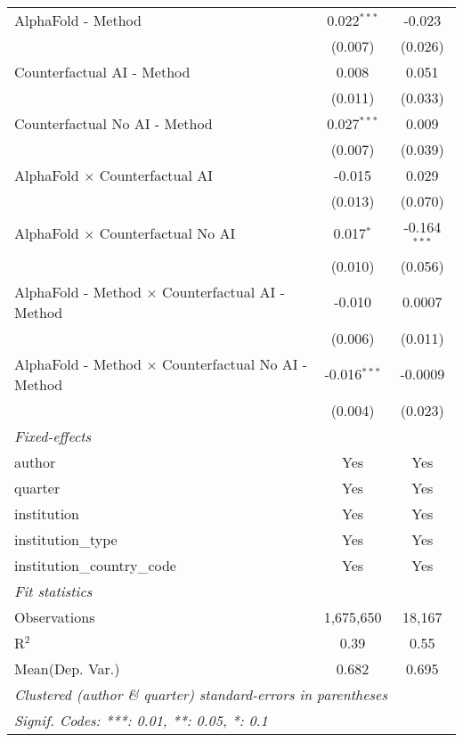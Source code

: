 \begin{tabular}{lcc}
   AlphaFold - Method                                         & 0.022$^{***}$  & -0.023\\   
                                                              & (0.007)        & (0.026)\\   
   Counterfactual AI - Method                                 & 0.008          & 0.051\\   
                                                              & (0.011)        & (0.033)\\   
   Counterfactual No AI - Method                              & 0.027$^{***}$  & 0.009\\   
                                                              & (0.007)        & (0.039)\\   
   AlphaFold $\times$ Counterfactual AI                       & -0.015         & 0.029\\   
                                                              & (0.013)        & (0.070)\\   
   AlphaFold $\times$ Counterfactual No AI                    & 0.017$^{*}$    & -0.164$^{***}$\\   
                                                              & (0.010)        & (0.056)\\   
   AlphaFold - Method $\times$ Counterfactual AI - Method     & -0.010         & 0.0007\\   
                                                              & (0.006)        & (0.011)\\   
   AlphaFold - Method $\times$ Counterfactual No AI - Method  & -0.016$^{***}$ & -0.0009\\   
                                                              & (0.004)        & (0.023)\\   
   \midrule
   \emph{Fixed-effects}\\
   author                                                     & Yes            & Yes\\  
   quarter                                                    & Yes            & Yes\\  
   institution                                                & Yes            & Yes\\  
   institution\_type                                          & Yes            & Yes\\  
   institution\_country\_code                                 & Yes            & Yes\\  
   \midrule
   \emph{Fit statistics}\\
   Observations                                               & 1,675,650      & 18,167\\  
   R$^2$                                                      & 0.39           & 0.55\\  
Mean(Dep. Var.) & 0.682 & 0.695 \\
   \midrule \midrule
   \multicolumn{3}{l}{\emph{Clustered (author \& quarter) standard-errors in parentheses}}\\
   \multicolumn{3}{l}{\emph{Signif. Codes: ***: 0.01, **: 0.05, *: 0.1}}\\
\end{tabular}
\par\endgroup
